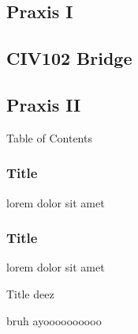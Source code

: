 \documentclass[aspectratio=1610]{beamer}
\begin{document}
\subsection{Praxis I}
\subsection{CIV102 Bridge}
\subsection{Praxis II}

{
\begin{frame}{Table of Contents}
\end{frame}
}

\begin{frame}
    \frametitle{Title}
    lorem dolor sit amet
\end{frame}

\begin{frame}
    \frametitle{Title}
    lorem dolor sit amet
\end{frame}

\begin{frame}{Title deez}

\end{frame}

\begin{frame}{b}{ruh}
    ayoooooooooo

\end{frame}
\end{document}
